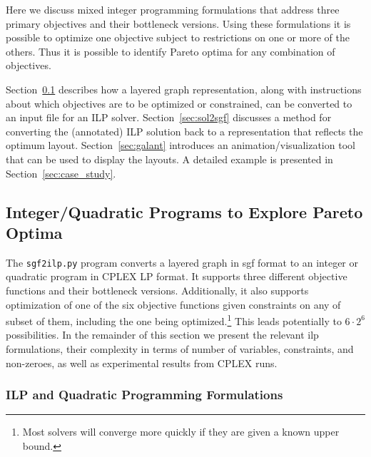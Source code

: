 Here we discuss mixed integer programming formulations that address
three primary objectives and their bottleneck versions. Using these
formulations it is possible to optimize one objective subject to
restrictions on one or more of the others.
Thus it is possible to identify Pareto optima for any combination of objectives.

Section~\ref{sec:sgf2ilp} describes how a layered graph representation, along with instructions about which objectives are to be optimized or constrained, can be converted to an input file for an ILP solver.
Section~\ref{sec:sol2sgf} discusses a method for converting the (annotated) ILP solution back to a representation that reflects the optimum layout. Section~\ref{sec:galant} introduces an animation/visualization tool that can be used to display the layouts. A detailed example is presented in Section~\ref{sec:case_study}.

\subsection{Integer/Quadratic Programs to Explore Pareto Optima} \label{sec:sgf2ilp}

The \texttt{sgf2ilp.py} program converts a layered graph in sgf format to an integer or
quadratic program in CPLEX\cite{CPLEX} LP format. It supports three different objective functions and their bottleneck versions. Additionally, it also supports optimization of one of the six objective functions given constraints on any of subset of them, including the one being optimized.\footnote{Most solvers will converge more quickly if they are given a known upper bound.} This leads potentially to $6 \cdot 2^6$ possibilities. In the remainder of this section we present the relevant ilp formulations, their complexity in terms of number of variables, constraints, and non-zeroes, as well as experimental results from CPLEX runs.

\subsubsection{ILP and Quadratic Programming Formulations}

